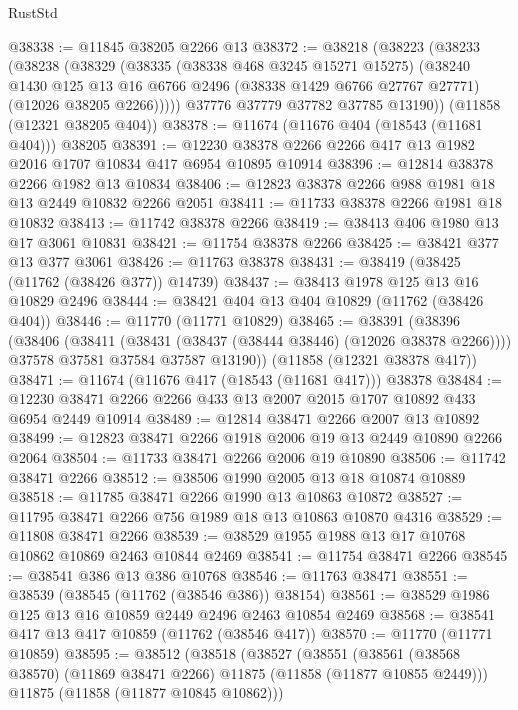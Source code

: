\begin{lexlean}{RustStd}
\begin{coremodule}
@38338 := @11845 @38205 @2266 @13
@38372 := @38218
    (@38223
      (@38233
        (@38238
          (@38329
            (@38335
              (@38338 @468 @3245 @15271 @15275)
              (@38240
                @1430
                @125
                @13
                @16
                @6766
                @2496
                (@38338 @1429 @6766 @27767 @27771)
                (@12026 @38205 @2266)))))
        @37776
        @37779
        @37782
        @37785
        @13190))
    (@11858 (@12321 @38205 @404))
@38378 := @11674 (@11676 @404 (@18543 (@11681 @404))) @38205
@38391 := @12230 @38378 @2266 @2266 @417 @13 @1982 @2016 @1707 @10834 @417 @6954 @10895 @10914
@38396 := @12814 @38378 @2266 @1982 @13 @10834
@38406 := @12823 @38378 @2266 @988 @1981 @18 @13 @2449 @10832 @2266 @2051
@38411 := @11733 @38378 @2266 @1981 @18 @10832
@38413 := @11742 @38378 @2266
@38419 := @38413 @406 @1980 @13 @17 @3061 @10831
@38421 := @11754 @38378 @2266
@38425 := @38421 @377 @13 @377 @3061
@38426 := @11763 @38378
@38431 := @38419 (@38425 (@11762 (@38426 @377)) @14739)
@38437 := @38413 @1978 @125 @13 @16 @10829 @2496
@38444 := @38421 @404 @13 @404 @10829 (@11762 (@38426 @404))
@38446 := @11770 (@11771 @10829)
@38465 := @38391
    (@38396
      (@38406
        (@38411 (@38431 (@38437 (@38444 @38446) (@12026 @38378 @2266))))
        @37578
        @37581
        @37584
        @37587
        @13190))
    (@11858 (@12321 @38378 @417))
@38471 := @11674 (@11676 @417 (@18543 (@11681 @417))) @38378
@38484 := @12230 @38471 @2266 @2266 @433 @13 @2007 @2015 @1707 @10892 @433 @6954 @2449 @10914
@38489 := @12814 @38471 @2266 @2007 @13 @10892
@38499 := @12823 @38471 @2266 @1918 @2006 @19 @13 @2449 @10890 @2266 @2064
@38504 := @11733 @38471 @2266 @2006 @19 @10890
@38506 := @11742 @38471 @2266
@38512 := @38506 @1990 @2005 @13 @18 @10874 @10889
@38518 := @11785 @38471 @2266 @1990 @13 @10863 @10872
@38527 := @11795 @38471 @2266 @756 @1989 @18 @13 @10863 @10870 @4316
@38529 := @11808 @38471 @2266
@38539 := @38529 @1955 @1988 @13 @17 @10768 @10862 @10869 @2463 @10844 @2469
@38541 := @11754 @38471 @2266
@38545 := @38541 @386 @13 @386 @10768
@38546 := @11763 @38471
@38551 := @38539 (@38545 (@11762 (@38546 @386)) @38154)
@38561 := @38529 @1986 @125 @13 @16 @10859 @2449 @2496 @2463 @10854 @2469
@38568 := @38541 @417 @13 @417 @10859 (@11762 (@38546 @417))
@38570 := @11770 (@11771 @10859)
@38595 := @38512
    (@38518
      (@38527
        (@38551
          (@38561 (@38568 @38570) (@11869 @38471 @2266) @11875 (@11858 (@11877 @10855 @2449)))
          @11875
          (@11858 (@11877 @10845 @10862)))

\end{coremodule}
\end{lexlean}
